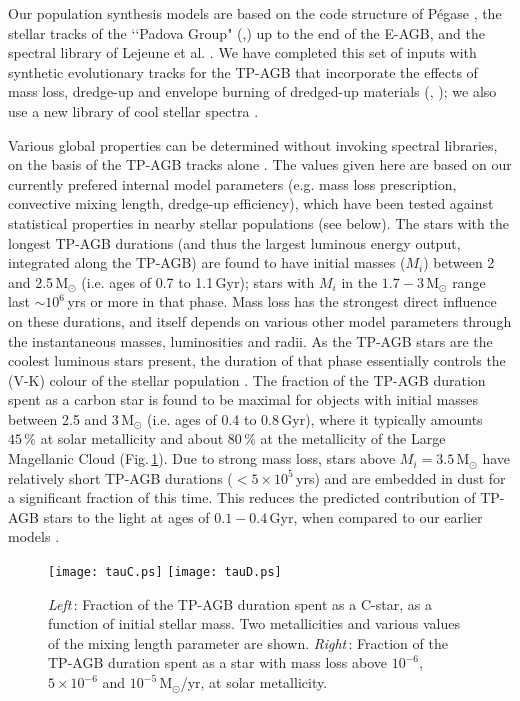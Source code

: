 \documentclass[runningheads]{svmult}
\begin{document}
Our population synthesis models are based on the code structure of
{\sc P\'egase} \cite{FRV97}, the stellar tracks of the \lq \lq Padova
Group" (\cite{BFBC93},\cite{FBBC94}) up to the end of the E-AGB,
and the spectral library of Lejeune et al. \cite{LCB97}.
We have completed this set of inputs with synthetic evolutionary
tracks for the TP-AGB that incorporate the effects of mass loss,
dredge-up and envelope burning of dredged-up materials (\cite{ML00},
\cite{ML01}); we also use a new library of cool stellar spectra \cite{LW00}.

Various global properties can be determined without invoking
spectral libraries, on the basis of the TP-AGB tracks alone
\cite{ML01}. The values given here are based on our currently
prefered internal model parameters (e.g. mass loss prescription,
convective mixing length, dredge-up efficiency), which have been
tested against statistical properties in nearby stellar populations
(see below).
The stars with the
longest TP-AGB durations (and thus the largest luminous energy output, 
integrated along the TP-AGB) are found to have initial masses ($M_i$) 
between 2 and 2.5\,M$_{\odot}$ (i.e. ages of 0.7 to 1.1\,Gyr);
stars with $M_i$ in the $1.7-3$\,M$_{\odot}$ range last 
$\sim 10^6$\,yrs or more in that phase. Mass loss has the strongest
direct influence on these durations, and itself depends on various
other model parameters through the instantaneous masses, luminosities
and radii. As the TP-AGB stars are the coolest
luminous stars present, the duration of that phase essentially controls the 
(V-K) colour of the stellar population \cite{GB98}.
The fraction of the TP-AGB duration spent as a carbon star is found to be 
maximal for objects with initial masses between 2.5 and 3\,M$_{\odot}$
(i.e. ages of 0.4 to 0.8\,Gyr), where it typically amounts 
$45\,\%$ at solar metallicity and about $80\,\%$ at the metallicity of the Large
Magellanic Cloud (Fig.\,\ref{fractions.fig}). 
Due to strong mass loss, stars above $M_i=3.5$\,M$_{\odot}$ have
relatively short TP-AGB durations ($< 5 \times 10^5$\,yrs) and are 
embedded in dust for a significant fraction of this time. This reduces
the predicted contribution of TP-AGB stars to the light at ages of
$0.1-0.4$\,Gyr, when compared to our earlier models \cite{LMFS99}.

\begin{figure}
\texttt{[image: tauC.ps]}
\texttt{[image: tauD.ps]}
\caption[]{
 {\em Left}\,: Fraction of the TP-AGB duration spent as a C-star, as 
 a function of initial stellar mass. Two metallicities and various
 values of the mixing length parameter are shown.
 {\em Right}\,: Fraction of the TP-AGB duration spent as a star with
 mass loss above $10^{-6}$, $5\times 10^{-6}$ and $10^{-5}$\,M$_{\odot}$/yr,
 at solar metallicity.
}
\label{fractions.fig}
\end{figure}
\end{document}
